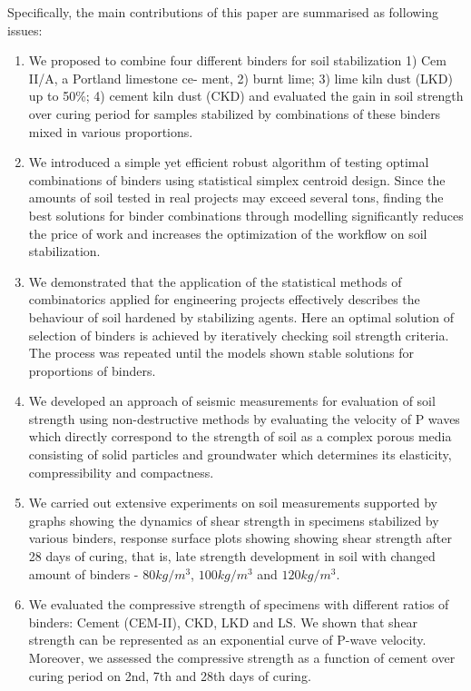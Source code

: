\documentclass[USenglish,twocolumn]{article}
\begin{document}
Specifically, the main contributions of this paper are summarised as following issues:
\begin{enumerate}
	\item We proposed to combine four different binders for soil stabilization  1) Cem II/A, a Portland limestone ce- ment, 2) burnt lime; 3) lime kiln dust (LKD) up to 50\%; 4) cement kiln dust (CKD) and evaluated the gain in soil strength over curing period for samples stabilized by combinations of these binders mixed in various proportions.
	\item We introduced a simple yet efficient robust algorithm of testing optimal combinations of binders using statistical simplex centroid design. Since the amounts of soil tested in real projects may exceed several tons, finding the best solutions for binder combinations through modelling significantly reduces the price of work and increases the optimization of the workflow on soil stabilization.
	\item We demonstrated that the application of the statistical methods of combinatorics applied for engineering projects effectively describes the behaviour of soil hardened by stabilizing agents. Here an optimal solution of selection of binders is achieved by iteratively checking soil strength criteria. The process was repeated until the models shown stable solutions for proportions of binders.
	\item We developed an approach of seismic measurements for evaluation of soil strength using non-destructive methods by evaluating the velocity of P waves which directly correspond to the strength of soil as a complex porous media consisting of solid particles and groundwater which determines its elasticity, compressibility and compactness.
	\item We carried out extensive experiments on soil measurements supported by graphs showing the dynamics of shear strength in specimens stabilized by various binders, response surface plots showing showing shear strength after 28 days of curing, that is, late strength development in soil with changed amount of binders - $80 kg/m^3$, $100kg/m^3$ and $120kg/m^3$.
	\item We evaluated the compressive strength of specimens with different ratios of binders: Cement (CEM-II), CKD, LKD and LS. We shown that shear strength can be represented as an exponential curve of P-wave velocity. Moreover, we assessed the compressive strength as a function of cement over curing period on 2nd, 7th and 28th days of curing.
\end{enumerate}
\end{document}
